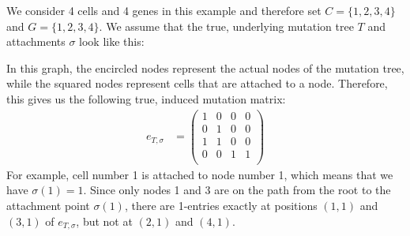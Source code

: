 \begin{example}
    \label{exmpl:scite_problem}
    We consider 4 cells and 4 genes in this example and therefore set $C = \{1,2,3,4\}$ and $G = \{1,2,3,4\}$. We assume that the true, underlying mutation tree $T$ and attachments $\sigma$ look like this:
    \begin{center}
    \end{center}
    In this graph, the encircled nodes represent the actual nodes of the mutation tree, while the squared nodes represent cells that are attached to a node. Therefore, this gives us the following true, induced mutation matrix:
    \begin{align*}
        e_{T, \sigma} &= \begin{pmatrix}
            1 & 0 & 0 & 0 \\
            0 & 1 & 0 & 0 \\
            1 & 1 & 0 & 0 \\
            0 & 0 & 1 & 1 \\
        \end{pmatrix}
    \end{align*}
    For example, cell number 1 is attached to node number 1, which means that we have $\sigma(1) = 1$. Since only nodes 1 and 3 are on the path from the root to the attachment point $\sigma(1)$, there are 1-entries exactly at positions $(1,1)$ and $(3,1)$ of $e_{T, \sigma}$, but not at $(2,1)$ and $(4,1)$.
    

\end{example}
